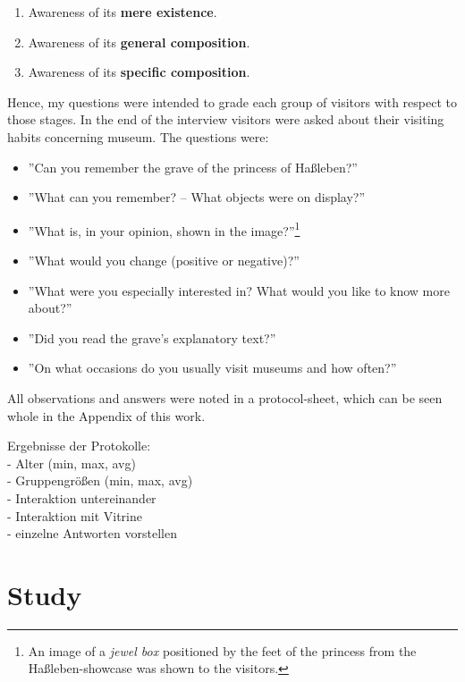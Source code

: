 \begin{enumerate}
	\item Awareness of its \textbf{mere existence}.
	\item Awareness of its \textbf{general composition}.
	\item Awareness of its \textbf{specific composition}.
\end{enumerate} 
 
Hence, my questions were intended to grade each group of visitors with respect to those stages. In the end of the interview visitors were asked about their visiting habits concerning museum. The questions were:

\begin{itemize}
	\item ''Can you remember the grave of the princess of Haßleben?''
	\item ''What can you remember? -- What objects were on display?''
	\item ''What is, in your opinion, shown in the image?''\footnote{An image of a \textit{jewel box} positioned by the feet of the princess from the Haßleben-showcase was shown to the visitors.}
	\item ''What would you change (positive or negative)?''
	\item ''What were you especially interested in? What would you like to know more about?''
	\item ''Did you read the grave's explanatory text?''
	\item ''On what occasions do you usually visit museums and how often?''
\end{itemize}

All observations and answers were noted in a protocol-sheet, which can be seen whole in the Appendix of this work. 

Ergebnisse der Protokolle:
\\- Alter (min, max, avg)
\\- Gruppengrößen (min, max, avg)
\\- Interaktion untereinander
\\- Interaktion mit Vitrine
\\- einzelne Antworten vorstellen


\section{Study}
\label{evaluation_study}

